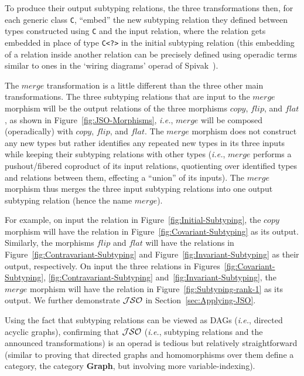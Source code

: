\documentclass[twocolumn,english]{article}
\numberwithin{equation}{section}
\numberwithin{figure}{section}
\newcommand{\code}[1]{\texttt{#1}}
\begin{document}
To produce their output subtyping relations, the three transformations
then, for each generic class \code{C}, ``embed'' the new subtyping
relation they defined between types constructed using \code{C} and
the input relation, where the relation gets embedded in place of type
\code{C<?>} in the initial subtyping relation (this embedding of
a relation inside another relation can be precisely defined using
operadic terms similar to ones in the `wiring diagrams' operad of
Spivak~\cite{Spivak2013,spivak2014category}).

The $merge$ transformation is a little different than the three other
main transformations. The three subtyping relations that are input
to the $merge$ morphism will be the output relations of the three
morphisms $copy$, $flip$, and $flat$, as shown in Figure~\ref{fig:JSO-Morphisms},
\emph{i.e.}, $merge$ will be composed (operadically) with $copy$,
$flip$, and $flat$. The $merge$ morphism does not construct any
new types but rather identifies any repeated new types in its three
inputs while keeping their subtyping relations with other types (\emph{i.e.},
$merge$ performs a pushout/fibered coproduct of its input relations,
quotienting over identified types and relations between them, effecting
a ``union'' of its inputs). The $merge$ morphism thus merges the
three input subtyping relations into one output subtyping relation
(hence the name $merge$).

For example, on input the relation in Figure~\ref{fig:Initial-Subtyping},
the $copy$ morphism will have the relation in Figure~\ref{fig:Covariant-Subtyping}
as its output. Similarly, the morphisms $flip$ and $flat$ will have
the relations in Figure~\ref{fig:Contravariant-Subtyping} and Figure~\ref{fig:Invariant-Subtyping}
as their output, respectively. On input the three relations in Figures~\ref{fig:Covariant-Subtyping},
\ref{fig:Contravariant-Subtyping} and~\ref{fig:Invariant-Subtyping},
the $merge$ morphism will have the relation in Figure~\ref{fig:Subtyping-rank-1}
as its output. We further demonstrate $\mathcal{JSO}$ in Section~\ref{sec:Applying-JSO}.

Using the fact that subtyping relations can be viewed as DAGs (\emph{i.e.},
directed acyclic graphs), confirming that $\mathcal{JSO}$ (\emph{i.e.}, subtyping
relations and the announced transformations) is an operad is tedious
but relatively straightforward (similar to proving that directed graphs
and homomorphisms over them define a category, the category \textbf{Graph},
but involving more variable-indexing).
\end{document}
